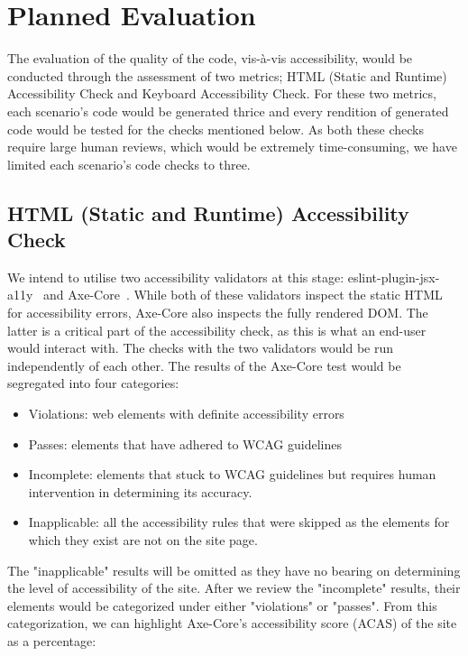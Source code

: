\documentclass[conference]{IEEEtran}
\begin{document}
\section{Planned Evaluation}

The evaluation of the quality of the code, vis-à-vis accessibility, would be conducted through the assessment of two metrics;
HTML (Static and Runtime) Accessibility Check and Keyboard Accessibility Check. For these two metrics, each scenario's code
would be generated thrice and every rendition of generated code would be tested for the checks mentioned below. As both these
checks require large human reviews, which would be extremely time-consuming, we have limited each scenario's code checks to three.

\subsection{HTML (Static and Runtime) Accessibility Check} 
We intend to utilise two accessibility validators at this stage: eslint-plugin-jsx-a11y~\cite{jsxa11y} and Axe-Core~\cite{deque2026accessibility}. 
While both of these validators inspect the static HTML for accessibility errors, Axe-Core also inspects
the fully rendered DOM. The latter is a critical part of the accessibility check, as this is what an end-user would interact
with. The checks with the two validators would be run independently of each other. The results of the Axe-Core test would 
be segregated into four categories: 

\begin{itemize}
  \item Violations: web elements with definite accessibility errors
  \item Passes: elements that have adhered to WCAG guidelines
  \item Incomplete: elements that stuck to WCAG guidelines but requires human intervention in determining its accuracy.
  \item Inapplicable: all the accessibility rules that were skipped as the elements for which they exist are not on the site page.
\end{itemize}

The "inapplicable" results will be omitted as they have no bearing on determining the level of accessibility of the site.
After we review the "incomplete" results, their elements would be categorized under either "violations" or "passes". From 
this categorization, we can highlight Axe-Core's accessibility score (ACAS) of the site as a percentage:
\end{document}
